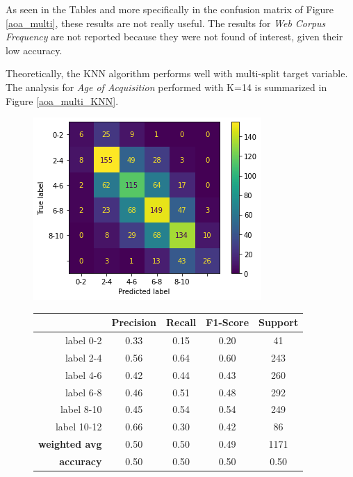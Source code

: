 \documentclass[a4paper,11pt,dvipsnames]{article}
\begin{document}
As seen in the Tables and more specifically in the confusion matrix of Figure \ref{aoa_multi}, these results are not really useful. The results for \textit{Web Corpus Frequency} are not reported because they were not found of interest, given their low accuracy.

Theoretically, the KNN algorithm performs well with multi-split target variable. The analysis for \textit{Age of Acquisition} performed with K=14 is summarized in Figure \ref{aoa_multi_KNN}.

\begin{figure}[h]
  \begin{minipage}{.4\linewidth}
    \centering
    \includegraphics[width=\textwidth]{aoa_multi_knn_matrix.png}%
  \end{minipage}
  \begin{minipage}{.2\linewidth}
    \centering

\begin{tabular}{|r|c|c|c|c|}
\toprule
{} &  \textbf{Precision} &    \textbf{Recall} &  \textbf{F1-Score} &      \textbf{Support} \\
\midrule\midrule
label 0-2     &   0.33 &  0.15 &  0.20 &    41 \\
label 2-4     &   0.56 &  0.64 &  0.60 &   243 \\
label 4-6     &   0.42 &  0.44 &  0.43 &   260 \\
label 6-8     &   0.46 &  0.51 &  0.48 &   292 \\
label 8-10    &   0.45 &  0.54 &  0.54 &   249 \\
label 10-12   &   0.66 &  0.30 &  0.42 &    86 \\\hline
\textbf{weighted avg} &   0.50 &  0.50 &  0.49 &  1171 \\
\textbf{accuracy}     &   0.50 &  0.50 &  0.50 &     0.50 \\
\bottomrule
\end{tabular}



\end{minipage}
\end{figure}
\end{document}
